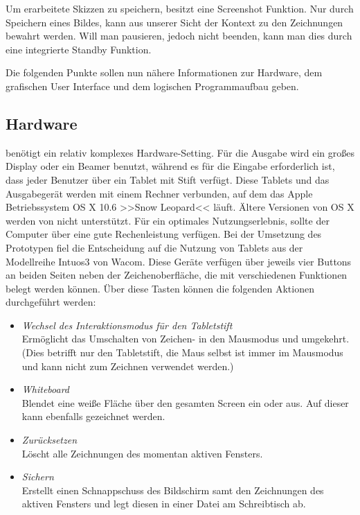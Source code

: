 \medskip Um erarbeitete Skizzen zu speichern, besitzt \scribbler eine Screenshot Funktion. Nur durch Speichern eines Bildes, kann aus unserer Sicht der Kontext zu den Zeichnungen bewahrt werden. Will man \scribbler pausieren, jedoch nicht beenden, kann man dies durch eine integrierte Standby Funktion.

\medskip Die folgenden Punkte sollen nun nähere Informationen zur Hardware, dem grafischen User Interface und dem logischen Programmaufbau geben. 

\subsection{Hardware} \label{ssec:hardware} 
\scribbler benötigt ein relativ komplexes Hardware-Setting. Für die Ausgabe wird ein großes Display oder ein Beamer benutzt, während es für die Eingabe erforderlich ist, dass jeder Benutzer über ein Tablet mit Stift verfügt. Diese Tablets und das Ausgabegerät werden mit einem Rechner verbunden, auf dem das Apple Betriebssystem OS X 10.6 >>Snow Leopard<< läuft. Ältere Versionen von OS X werden von \scribbler nicht unterstützt. Für ein optimales Nutzungserlebnis, sollte der Computer über eine gute Rechenleistung verfügen. Bei der Umsetzung des Prototypen fiel die Entscheidung auf die Nutzung von Tablets aus der Modellreihe Intuos3 von Wacom. Diese Geräte verfügen über jeweils vier Buttons an beiden Seiten neben der Zeichenoberfläche, die mit verschiedenen Funktionen belegt werden können. Über diese Tasten können die folgenden Aktionen durchgeführt werden:

\begin{itemize}
	\item \emph{Wechsel des Interaktionsmodus für den Tabletstift}\\
	Ermöglicht das Umschalten von Zeichen- in den Mausmodus und umgekehrt. (Dies betrifft nur den Tabletstift, die Maus selbst ist immer im Mausmodus und kann nicht zum Zeichnen verwendet werden.)
	\item \emph{Whiteboard}\\
	Blendet eine weiße Fläche über den gesamten Screen ein oder aus. Auf dieser kann ebenfalls gezeichnet werden.
	\item \emph{Zurücksetzen}\\
	Löscht alle Zeichnungen des momentan aktiven Fensters.
	\item \emph{Sichern}\\
	Erstellt einen Schnappschuss des Bildschirm samt den Zeichnungen des aktiven Fensters und legt diesen in einer Datei am Schreibtisch ab.
\end{itemize}

